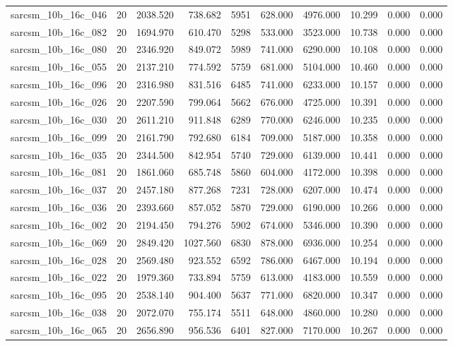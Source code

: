\begin{tabular}{lrrrrrrrrr}
sarcsm\_10b\_16c\_046 & 20 & 2038.520 & 738.682 & 5951 & 628.000 & 4976.000 & 10.299 & 0.000 & 0.000 \\
sarcsm\_10b\_16c\_082 & 20 & 1694.970 & 610.470 & 5298 & 533.000 & 3523.000 & 10.738 & 0.000 & 0.000 \\
sarcsm\_10b\_16c\_080 & 20 & 2346.920 & 849.072 & 5989 & 741.000 & 6290.000 & 10.108 & 0.000 & 0.000 \\
sarcsm\_10b\_16c\_055 & 20 & 2137.210 & 774.592 & 5759 & 681.000 & 5104.000 & 10.460 & 0.000 & 0.000 \\
sarcsm\_10b\_16c\_096 & 20 & 2316.980 & 831.516 & 6485 & 741.000 & 6233.000 & 10.157 & 0.000 & 0.000 \\
sarcsm\_10b\_16c\_026 & 20 & 2207.590 & 799.064 & 5662 & 676.000 & 4725.000 & 10.391 & 0.000 & 0.000 \\
sarcsm\_10b\_16c\_030 & 20 & 2611.210 & 911.848 & 6289 & 770.000 & 6246.000 & 10.235 & 0.000 & 0.000 \\
sarcsm\_10b\_16c\_099 & 20 & 2161.790 & 792.680 & 6184 & 709.000 & 5187.000 & 10.358 & 0.000 & 0.000 \\
sarcsm\_10b\_16c\_035 & 20 & 2344.500 & 842.954 & 5740 & 729.000 & 6139.000 & 10.441 & 0.000 & 0.000 \\
sarcsm\_10b\_16c\_081 & 20 & 1861.060 & 685.748 & 5860 & 604.000 & 4172.000 & 10.398 & 0.000 & 0.000 \\
sarcsm\_10b\_16c\_037 & 20 & 2457.180 & 877.268 & 7231 & 728.000 & 6207.000 & 10.474 & 0.000 & 0.000 \\
sarcsm\_10b\_16c\_036 & 20 & 2393.660 & 857.052 & 5870 & 729.000 & 6190.000 & 10.266 & 0.000 & 0.000 \\
sarcsm\_10b\_16c\_002 & 20 & 2194.450 & 794.276 & 5902 & 674.000 & 5346.000 & 10.390 & 0.000 & 0.000 \\
sarcsm\_10b\_16c\_069 & 20 & 2849.420 & 1027.560 & 6830 & 878.000 & 6936.000 & 10.254 & 0.000 & 0.000 \\
sarcsm\_10b\_16c\_028 & 20 & 2569.480 & 923.552 & 6592 & 786.000 & 6467.000 & 10.194 & 0.000 & 0.000 \\
sarcsm\_10b\_16c\_022 & 20 & 1979.360 & 733.894 & 5759 & 613.000 & 4183.000 & 10.559 & 0.000 & 0.000 \\
sarcsm\_10b\_16c\_095 & 20 & 2538.140 & 904.400 & 5637 & 771.000 & 6820.000 & 10.347 & 0.000 & 0.000 \\
sarcsm\_10b\_16c\_038 & 20 & 2072.070 & 755.174 & 5511 & 648.000 & 4860.000 & 10.280 & 0.000 & 0.000 \\
sarcsm\_10b\_16c\_065 & 20 & 2656.890 & 956.536 & 6401 & 827.000 & 7170.000 & 10.267 & 0.000 & 0.000 \\

\end{tabular}
